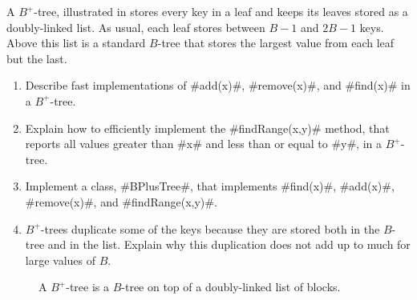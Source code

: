 \begin{exc}
  A $B^+$-tree, illustrated in  stores every key in a
  leaf and keeps its leaves stored as a doubly-linked list.  As usual,
  each leaf stores between $B-1$ and $2B-1$ keys.  Above this list is
  a standard $B$-tree that stores the largest value from each leaf but
  the last.
  \begin{enumerate}
    \item Describe fast implementations of #add(x)#, #remove(x)#,
      and #find(x)# in a $B^+$-tree.
    \item Explain how to efficiently implement the #findRange(x,y)# method,
      that reports all values
      greater than #x# and less than or equal to #y#, in
      a $B^+$-tree.
    \item Implement a class, #BPlusTree#, that implements #find(x)#,
      #add(x)#, #remove(x)#, and #findRange(x,y)#.
    \item $B^+$-trees duplicate some of the keys because they are stored
      both in the $B$-tree and in the list.  Explain why this duplication
      does not add up to much for large values of $B$.
  \end{enumerate}
\end{exc}

\begin{figure}
  \caption{A $B^+$-tree is a $B$-tree on top of a doubly-linked list of blocks.}
\end{figure}


